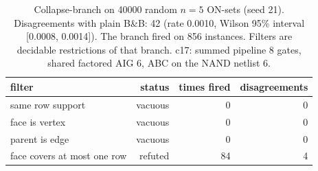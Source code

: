 \begin{table}[h]
\centering\small
\caption{Collapse-branch on 40000 random $n=5$ ON-sets (seed 21). Disagreements with plain B\&B: 42 (rate 0.0010, Wilson 95\% interval [0.0008, 0.0014]). The branch fired on 856 instances. Filters are decidable restrictions of that branch. c17: summed pipeline 8 gates, shared factored AIG 6, ABC on the NAND netlist 6.}
\label{tab:audit5}
\begin{tabular}{lrrr}
\hline
filter & status & times fired & disagreements \\
\hline
same row support & vacuous & 0 & 0 \\
face is vertex & vacuous & 0 & 0 \\
parent is edge & vacuous & 0 & 0 \\
face covers at most one row & refuted & 84 & 4 \\
\hline
\end{tabular}
\end{table}
